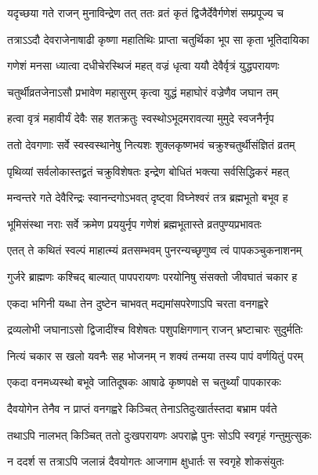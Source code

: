 \twolineshloka
{यदृच्छया गते राजन् मुनाविन्द्रेण तत् ततः}
{व्रतं कृतं द्विजैर्देवैर्गणेशं सम्प्रपूज्य च} %

\twolineshloka
{तत्राऽऽदौ देवराजेनाषाढी कृष्णा महातिथिः}
{प्राप्ता चतुर्थिका भूप सा कृता भूतिदायिका} %

\twolineshloka
{गणेशं मनसा ध्यात्वा दधीचेरस्थिजं महत्}
{वज्रं धृत्वा ययौ देवैर्वृत्रं युद्धपरायणः} %

\twolineshloka
{चतुर्थीव्रतजेनाऽसौ प्रभावेण महासुरम्}
{कृत्वा युद्धं महाघोरं वज्रेणैव जघान तम्} %

\twolineshloka
{हत्वा वृत्रं महावीर्यं देवैः सह शतक्रतुः}
{स्वस्थोऽभूदमरावत्या मुमुदे स्वजनैर्नृप} %

\twolineshloka
{ततो देवगणाः सर्वे स्वस्वस्थानेषु नित्यशः}
{शुक्लकृष्णभवं चक्रुश्चतुर्थीसंज्ञितं व्रतम्} %

\twolineshloka
{पृथिव्यां सर्वलोकास्तद्व्रतं चक्रुविशेषतः}
{इन्द्रेण बोधितं भक्त्या सर्वसिद्धिकरं महत्} %

\twolineshloka
{मन्वन्तरे गते देवैरिन्द्रः स्वानन्दगोऽभवत्}
{दृष्ट्वा विघ्नेश्वरं तत्र ब्रह्मभूतो बभूव ह} %

\twolineshloka
{भूमिसंस्था नराः सर्वे क्रमेण प्रययुर्नृप}
{गणेशं ब्रह्मभूतास्ते व्रतपुण्यप्रभावतः} %

\twolineshloka
{एतत् ते कथितं स्वल्पं माहात्म्यं व्रतसम्भवम्}
{पुनरन्यच्छृणुष्व त्वं पापकञ्चुकनाशनम्} %

\twolineshloka
{गुर्जरे ब्राह्मणः कश्चिद् बाल्यात् पापपरायणः}
{परयोनिषु संसक्तो जीवघातं चकार ह} %

\twolineshloka
{एकदा भगिनी यब्धा तेन दुष्टेन चाभवत्}
{मद्यमांसपरेणाऽपि चरता वनगह्वरे} %

\twolineshloka
{द्रव्यलोभी जघानाऽसो द्विजादींश्च विशेषतः}
{पशुपक्षिगणान् राजन् भ्रष्टाचारः सुदुर्मतिः} %

\twolineshloka
{नित्यं चकार स खलो यवनैः सह भोजनम्}
{न शक्यं तन्मया तस्य पापं वर्णयितुं परम्} %

\twolineshloka
{एकदा वनमध्यस्थो बभूवे जातिदूषकः}
{आषाढे कृष्णपक्षे स चतुर्थ्यां पापकारकः} %

\twolineshloka
{दैवयोगेन तेनैव न प्राप्तं वनगह्वरे}
{किञ्चित् तेनाऽतिदुःखार्तस्तदा बभ्राम पर्वते} %

\twolineshloka
{तथाऽपि नालभत् किञ्चित् ततो दुःखपरायणः}
{अपराह्णे पुनः सोऽपि स्वगृहं गन्तुमुत्सुकः} %

\twolineshloka
{न ददर्श स तत्राऽपि जलान्नं दैवयोगतः}
{आजगाम क्षुधार्तः स स्वगृहे शोकसंयुतः} %

